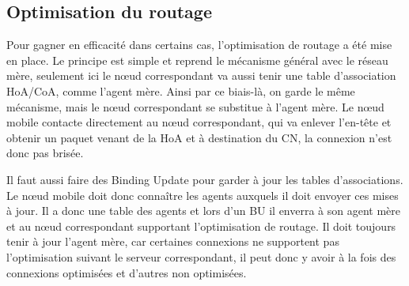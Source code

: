 \subsection{Optimisation du routage}

Pour gagner en efficacité dans certains cas, l’optimisation de routage a été mise en place.
Le principe est simple et reprend le mécanisme général avec le réseau mère, seulement ici le nœud correspondant va aussi tenir une table d’association HoA/CoA, comme l'agent mère.
Ainsi par ce biais-là, on garde le même mécanisme, mais le nœud correspondant se substitue à l'agent mère.
Le nœud mobile contacte directement au nœud correspondant, qui va enlever l’en-tête et obtenir un paquet venant de la HoA et à destination du CN, la connexion n’est donc pas brisée.


Il faut aussi faire des Binding Update pour garder à jour les tables d’associations.
Le nœud mobile doit donc connaître les agents auxquels il doit envoyer ces mises à jour.
Il a donc une table des agents et lors d’un BU il enverra à son agent mère et au nœud correspondant supportant l’optimisation de routage.
Il doit toujours tenir à jour l’agent mère, car certaines connexions ne supportent pas l’optimisation suivant le serveur correspondant, il peut donc y avoir à la fois des connexions optimisées et d’autres non optimisées.



